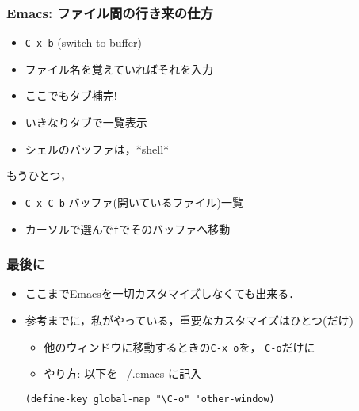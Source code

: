 \documentclass[12pt,dvipdfmx]{beamer}
\newcommand{\ao}[1]{{\color{blue}#1}}
\begin{document}
\begin{frame}
\frametitle{Emacs: ファイル間の行き来の仕方}

\begin{itemize}
\item \texttt{\ao{C-x b}} (switch to buffer)
\item ファイル名を覚えていればそれを入力
\item ここでもタブ補完!
\item いきなりタブで一覧表示
\item シェルのバッファは，*shell*
\end{itemize}
もうひとつ，
\begin{itemize}
\item \texttt{\ao{C-x C-b}} バッファ(開いているファイル)一覧
\item カーソルで選んで\texttt{\ao{f}}でそのバッファへ移動
\end{itemize}

\end{frame}

\begin{frame}[fragile]
\frametitle{最後に}

  \begin{itemize}
  \item ここまでEmacsを一切カスタマイズしなくても出来る．
  \item 参考までに，私がやっている，重要なカスタマイズはひとつ(だけ)
    \begin{itemize}
    \item 他のウィンドウに移動するときの\texttt{C-x o}を，
      \texttt{\ao{C-o}}だけに
    \item やり方: 以下を ~/.emacs に記入
    \end{itemize}
\begin{lstlisting}
(define-key global-map "\C-o" 'other-window)
\end{lstlisting}
 \end{itemize}
\end{frame}
\end{document}
